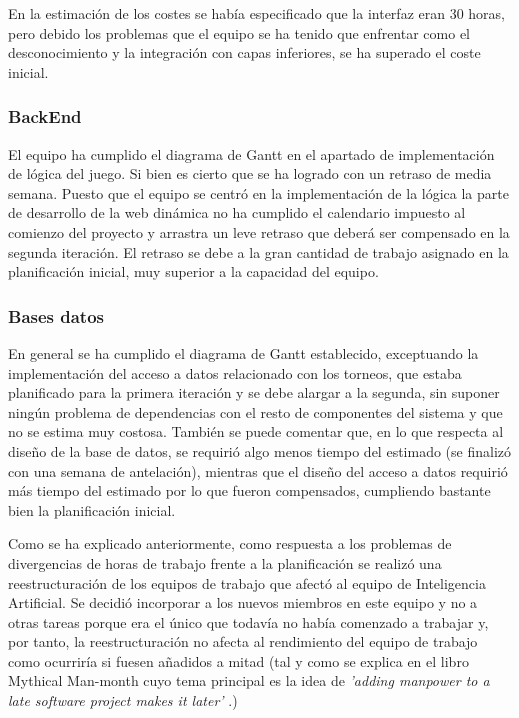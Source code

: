 En la estimación de los costes se había especificado que la interfaz eran 30 horas, pero debido los problemas que el equipo se ha tenido que enfrentar como el desconocimiento y la integración con capas inferiores, se ha superado el coste inicial.

\subsubsection*{BackEnd}
El equipo ha cumplido el diagrama de Gantt en el apartado de implementación de lógica del juego. Si bien es cierto que se ha logrado con un retraso de media semana. Puesto que el equipo se centró en la implementación de la lógica la parte de desarrollo de la web dinámica no ha cumplido el calendario impuesto al comienzo del proyecto y arrastra un leve retraso que deberá ser compensado en la segunda iteración. El retraso se debe a la gran cantidad de trabajo asignado en la planificación inicial, muy superior a la capacidad del equipo.

\subsubsection*{Bases datos}
En general se ha cumplido el diagrama de Gantt establecido, exceptuando la implementación del acceso a datos relacionado con los torneos, que estaba planificado para la primera iteración y se debe alargar a la segunda, sin suponer ningún problema de dependencias con el resto de componentes del sistema y que no se estima muy costosa. También se puede comentar que, en lo que respecta al diseño de la base de datos, se requirió algo menos tiempo del estimado (se finalizó con una semana de antelación), mientras que el diseño del acceso a datos requirió más tiempo del estimado por lo que fueron compensados, cumpliendo bastante bien la planificación inicial.

Como se ha explicado anteriormente, como respuesta a los problemas de divergencias de horas de trabajo frente a la planificación se realizó una reestructuración de los equipos de trabajo que afectó al equipo de Inteligencia Artificial. Se decidió incorporar a los nuevos miembros en este equipo y no a otras tareas porque era el único que todavía no había comenzado a trabajar y, por tanto, la reestructuración no afecta al rendimiento del equipo de trabajo como ocurriría si fuesen añadidos a mitad (tal y como se explica en el libro Mythical Man-month cuyo tema principal es la idea de \textit{'adding manpower to a late software project makes it later'} \cite{libroMMM}.)
